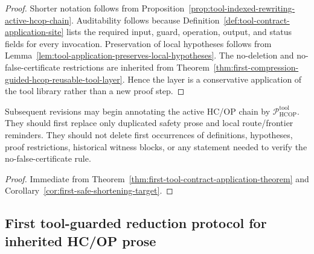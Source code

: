 \begin{proof}
Shorter notation follows from Proposition~\ref{prop:tool-indexed-rewriting-active-hcop-chain}. Auditability follows because Definition~\ref{def:tool-contract-application-site} lists the required input, guard, operation, output, and status fields for every invocation. Preservation of local hypotheses follows from Lemma~\ref{lem:tool-application-preserves-local-hypotheses}. The no-deletion and no-false-certificate restrictions are inherited from Theorem~\ref{thm:first-compression-guided-hcop-reusable-tool-layer}. Hence the layer is a conservative application of the tool library rather than a new proof step.
\end{proof}

\begin{corollary}
\label{cor:v3340-r10-working-rule}
Subsequent revisions may begin annotating the active HC/OP chain by \(\mathcal P_{\mathrm{HCOP}}^{\mathrm{tool}}\). They should first replace only duplicated safety prose and local route/frontier reminders. They should not delete first occurrences of definitions, hypotheses, proof restrictions, historical witness blocks, or any statement needed to verify the no-false-certificate rule.
\end{corollary}

\begin{proof}
Immediate from Theorem~\ref{thm:first-tool-contract-application-theorem} and Corollary~\ref{cor:first-safe-shortening-target}.
\end{proof}


\subsection{First tool-guarded reduction protocol for inherited HC/OP prose}
\label{subsec:first-tool-guarded-reduction-protocol-inherited-hcop-prose}

